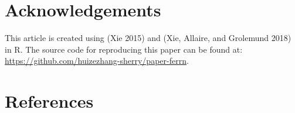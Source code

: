 \hypertarget{acknowledgements}{%
\section{Acknowledgements}\label{acknowledgements}}

This article is created using  (Xie 2015) and  (Xie, Allaire, and Grolemund 2018) in R. The source code for reproducing this paper can be found at: \url{https://github.com/huizezhang-sherry/paper-ferrn}.

\hypertarget{references}{%
\section*{References}\label{references}}

